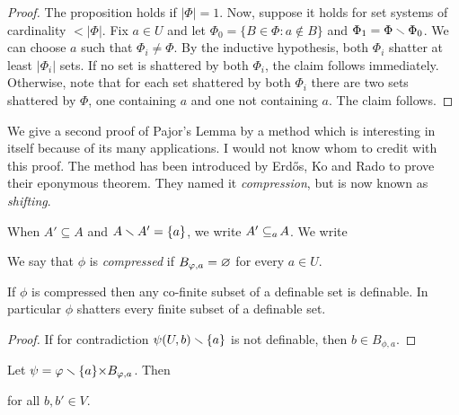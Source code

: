 \documentclass[sputnik.tex]{subfiles}
\begin{document}

\begin{proof}
The proposition holds if $|\Phi|=1$.
Now, suppose it holds for set systems of cardinality $<|\Phi|$.
Fix $a\in U$ and let $\Phi_0=\big\{B\in\Phi : a\notin B\big\}$ and $\Phi_1=\Phi\smallsetminus\Phi_0$.
We can choose $a$ such that $\Phi_i\neq\Phi$.
By the inductive hypothesis, both $\Phi_i$ shatter at least $\big|\Phi_i\big|$ sets.
If no set is shattered by both $\Phi_i$, the claim follows immediately.
Otherwise, note that for each set shattered by both $\Phi_i$ there are two sets shattered by $\Phi$, one containing $a$ and one not containing $a$.
The claim follows.
\end{proof}
 
We give a second proof of Pajor's Lemma by a method which is interesting in itself because of its many applications.
I would not know whom to credit with this proof.
The method has been introduced by Erd\H{o}s, Ko and Rado to prove their eponymous theorem.
They named it \textit{compression}, but is now known as \textit{shifting}.


When $A'\subseteq A$ and $A\smallsetminus A'=\{a\}$, we write \emph{$A'\subseteq_{a}\kern-1.5pt A$}. We write


We say that $\phi$ is \emph{compressed\/} if $B_{\varphi,a}=\varnothing$ for every $a\in U$.

\begin{proposition}\label{prop_compressed} 
If $\phi$ is compressed then any co-finite subset of a definable set is definable.
In particular $\phi$ shatters every finite subset of a definable set.
\end{proposition}

\begin{proof}
If for contradiction $\psi(U,b)\smallsetminus\{a\}$ is not definable, then $b\in B_{\phi,a}$.
\end{proof}


\begin{proposition}\label{prop_conservative} Let $\psi=\varphi\smallsetminus\{a\}{\times}B_{\varphi,a}$.
Then

\hfill for all $b,b'\in V$.
\end{proposition}
\end{document}
